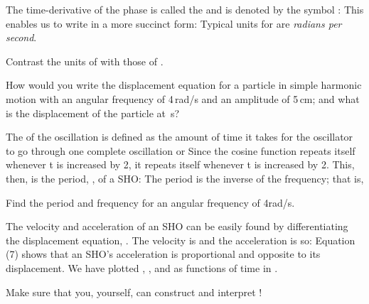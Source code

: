 {The time-derivative of the phase is called the  and is
denoted by the symbol \m{\omega}:
%
%
This enables us to write  in a more succinct form:
%
%
Typical units for \m{\omega} are {\em radians per second}.

\tryit Contrast the units of \m{\omega} with those of \m{\nu}. 

\tryit How would you write the displacement equation for a particle in
simple harmonic motion with an angular frequency of 4\m{\pi}\,rad/s and an
amplitude of 5\,cm; and what is the displacement of the particle at
\,s? 

The  of the oscillation is defined as the amount of time
it takes for the oscillator to go through one complete oscillation or 
Since the cosine function repeats itself whenever \m{\omega}t is increased by
2\m{\pi}, it repeats itself whenever t is increased by 2\m{\pi/\omega}.
This, then, is the period, , of a SHO:
%
%
The period is the inverse of the frequency; that is,
%
%

\tryit Find the period and frequency for an angular frequency of 4\m{\pi}\unit{rad/s}.

The velocity and acceleration of an SHO can be easily found
by differentiating the displacement equation, .
The velocity is
%
%
and the acceleration is
%
%
so:
%
%
Equation (7) shows that an SHO's acceleration is proportional and opposite
to its displacement.
We have plotted , , and  as functions of time in
.

\tryit Make sure that you, yourself, can construct and interpret !



}

